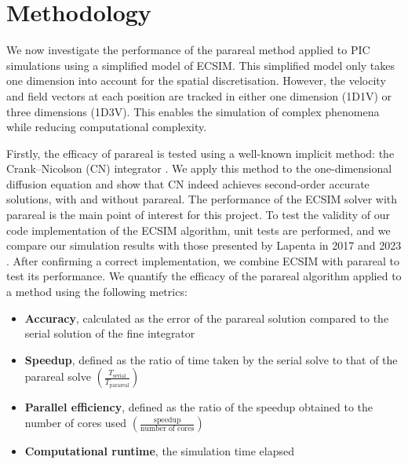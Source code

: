 \chapter{Methodology}
\label{cha: methodology}


We now investigate the performance of the parareal method applied to PIC simulations using a simplified model of ECSIM. This simplified model only takes one dimension into account for the spatial discretisation. However, the velocity and field vectors at each position are tracked in either one dimension (1D1V) or three dimensions (1D3V). This enables the simulation of complex phenomena while reducing computational complexity.

Firstly, the efficacy of parareal is tested using a well-known implicit method: the Crank--Nicolson (CN) integrator \cite{Crank_Nicolson_1947}. We apply this method to the one-dimensional diffusion equation and show that CN indeed achieves second-order accurate solutions, with and without parareal. The performance of the ECSIM solver with parareal is the main point of interest for this project. To test the validity of our code implementation of the ECSIM algorithm, unit tests are performed, and we compare our simulation results with those presented by Lapenta in 2017 and 2023 \cite{lapenta_exactly_2017,lapenta_advances_2023}. After confirming a correct implementation, we combine ECSIM with parareal to test its performance. We quantify the efficacy of the parareal algorithm applied to a method using the following metrics:
 \begin{itemize}
    
    \item \textbf{Accuracy}, calculated as the error of the parareal solution compared to the serial solution of the fine integrator
    
    \item \textbf{Speedup}, defined as the ratio of time taken by the serial solve to that of the parareal solve $\left(\frac{T_\mathrm{serial}}{T_\mathrm{parareal}}\right)$
    
    \item \textbf{Parallel efficiency}, defined as the ratio of the speedup obtained to the number of cores used $\left(\frac{\text{speedup}}{\text{number of cores}}\right)$
    
    \item \textbf{Computational runtime}, the simulation time elapsed
 
 \end{itemize}
